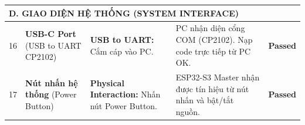 \begin{longtable}{|c|p{}|p{}|p{}|c|}
                    \multicolumn{5}{|l|}{\textbf{D. GIAO DIỆN HỆ THỐNG (SYSTEM INTERFACE)}} \\ \hline
        
                    16 & \textbf{USB-C Port} \newline (USB to UART CP2102) & \textbf{USB to UART:} \newline Cắm cáp vào PC. & PC nhận diện cổng COM (CP2102). Nạp code trực tiếp từ PC OK. & \textcolor{modern_blue}{\textbf{Passed}} \\ \hline
        
                    17 & \textbf{Nút nhấn hệ thống} \newline (Power Button) & \textbf{Physical Interaction:} \newline Nhấn nút Power Button. & ESP32-S3 Master nhận được tín hiệu từ nút nhấn và bật/tắt nguồn. & \textcolor{modern_blue}{\textbf{Passed}} \\ \hline
        
                \end{longtable}